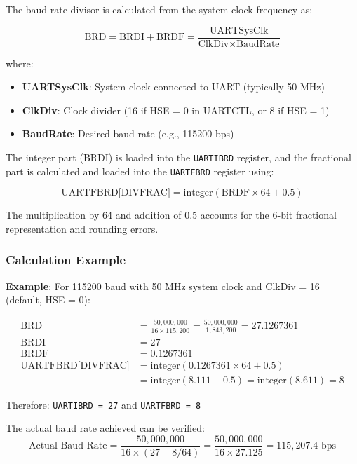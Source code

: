 The baud rate divisor is calculated from the system clock frequency as:

\begin{equation}
\text{BRD} = \text{BRDI} + \text{BRDF} = \frac{\text{UARTSysClk}}{\text{ClkDiv} \times \text{BaudRate}}
\end{equation}

where:
\begin{itemize}[nosep]
  \item \textbf{UARTSysClk}: System clock connected to UART (typically 50 MHz)
  \item \textbf{ClkDiv}: Clock divider (16 if HSE = 0 in UARTCTL, or 8 if HSE = 1)
  \item \textbf{BaudRate}: Desired baud rate (e.g., 115200 bps)
\end{itemize}

The integer part (BRDI) is loaded into the \texttt{UARTIBRD} register, and the fractional part is calculated and loaded into the \texttt{UARTFBRD} register using:

\begin{equation}
\text{UARTFBRD[DIVFRAC]} = \text{integer}(\text{BRDF} \times 64 + 0.5)
\end{equation}

The multiplication by 64 and addition of 0.5 accounts for the 6-bit fractional representation and rounding errors.

\subsubsection{Calculation Example}

\textbf{Example}: For 115200 baud with 50 MHz system clock and ClkDiv = 16 (default, HSE = 0):

\begin{align*}
\text{BRD} &= \frac{50{,}000{,}000}{16 \times 115{,}200} = \frac{50{,}000{,}000}{1{,}843{,}200} = 27.1267361 \\
\text{BRDI} &= 27 \\
\text{BRDF} &= 0.1267361 \\
\text{UARTFBRD[DIVFRAC]} &= \text{integer}(0.1267361 \times 64 + 0.5) \\
&= \text{integer}(8.111 + 0.5) = \text{integer}(8.611) = 8
\end{align*}

Therefore: \texttt{UARTIBRD = 27} and \texttt{UARTFBRD = 8}

The actual baud rate achieved can be verified:
\begin{equation}
\text{Actual Baud Rate} = \frac{50{,}000{,}000}{16 \times (27 + 8/64)} = \frac{50{,}000{,}000}{16 \times 27.125} = 115{,}207.4 \text{ bps}
\end{equation}

